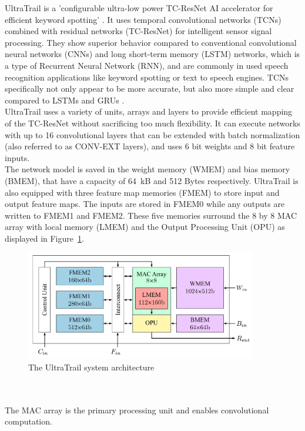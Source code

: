 UltraTrail is a 'configurable ultra-low power TC-ResNet AI accelerator for efficient keyword spotting' \cite{ultratrail}.
It uses temporal convolutional networks (TCNs) combined with residual networks (TC-ResNet) for intelligent sensor signal processing.
They show superior behavior compared to conventional convolutional neural networks (CNNs) and long short-term memory (LSTM) networks,
which is a type of Recurrent Neural Network (RNN), and are commonly in used speech recognition applications like keyword spotting or text to speech engines.
TCNs specifically not only appear to be more accurate, but also more simple and clear compared to LSTMs and GRUs \cite[Ch I]{ultratrail}.\\
UltraTrail uses a variety of units, arrays and layers to provide efficient mapping of the TC-ResNet without sacrificing too much flexibility.
It can execute networks with up to 16 convolutional layers that can be extended with batch normalization (also referred to as CONV-EXT layers),
and uses 6 bit weights and 8 bit feature inputs.\\
The network model is saved in the weight memory (WMEM) and bias memory (BMEM), that
have a capacity of 64 kB and 512 Bytes respectively.
UltraTrail is also equipped with three feature map memories (FMEM) to store input and output
feature maps. The inputs are stored in FMEM0 while any outputs are written to FMEM1 and FMEM2.
These five memories surround the 8 by 8 MAC array with local memory (LMEM) and the Output Processing Unit (OPU) as displayed in Figure~\ref{fig:ultratrail_arch}.
\begin{figure}[htb]
    \centering
    \includegraphics[width=0.9\textwidth]{figures/ultratrail.png}
    \caption[Illustration: The UltraTrail system architecture (Fig. 5)\cite{ultratrail}]{The UltraTrail system architecture}
    \label{fig:ultratrail_arch}
\end{figure}
\\\\
The MAC array is the primary processing unit and enables convolutional computation.
